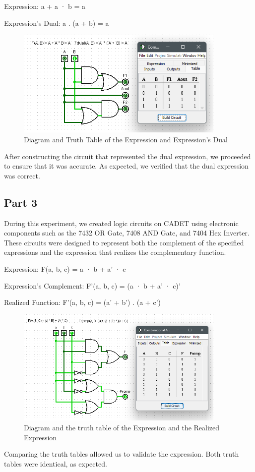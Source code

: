 \documentclass[pdftex,12pt,a4paper]{article}
\begin{document}
Expression: a + a · b = a

Expression's Dual: a . (a + b) = a
\begin{figure}[H]
	\centering
	\includegraphics[width=0.9\textwidth]{ex2.png}
	\caption{Diagram and Truth Table of the Expression and  Expression's Dual}
	\label{fig2}
\end{figure}

After constructing the circuit that represented the dual expression, we proceeded to ensure that it was accurate. As expected, we verified that the dual expression was correct.
\subsection{Part 3}
During this experiment, we created logic circuits on CADET using electronic components such as the 7432 OR Gate, 7408 AND Gate, and 7404 Hex Inverter. These circuits were designed to represent both the complement of the specified expressions and the expression that realizes the complementary function.

Expression: F(a, b, c) = a · b + a' · c

Expression's Complement: F'(a, b, c) = (a · b + a' · c)'

Realized Function: F'(a, b, c) = (a' + b') . (a + c')

\begin{figure}[H]
	\centering
	\includegraphics[width=0.9\textwidth]{ex3.png}
	\caption{Diagram and the truth table of the Expression and the Realized Expression}
	\label{fig3}
\end{figure}
Comparing the truth tables allowed us to validate the expression. Both truth tables were identical, as expected.
\end{document}
